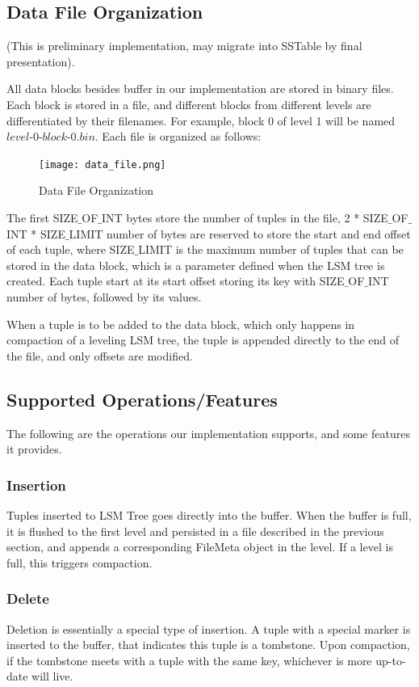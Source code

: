 \documentclass[sigconf]{acmart}
\begin{document}
    \subsection{Data File Organization}
    (This is preliminary implementation, may migrate into SSTable by final presentation).
    
    
    All data blocks besides buffer in our implementation are stored in binary files. Each block is stored in a file, and different blocks from different levels are differentiated by their filenames. For example, block 0 of level 1 will be named $level$-$0$-$block$-$0$.$bin$. Each file is organized as follows: 
    \begin{figure}[H]
        \centering
        \texttt{[image: data\_file.png]}
        \caption{Data File Organization}
        \label{Fig.main1}
    \end{figure}
    The first SIZE$\_$OF$\_$INT bytes store the number of tuples in the file, 2 * SIZE$\_$OF$\_$INT * SIZE$\_$LIMIT number of bytes are reserved to store the start and end offset of each tuple, where SIZE$\_$LIMIT is the maximum number of tuples that can be stored in the data block, which is a parameter defined when the LSM tree is created. Each tuple start at its start offset storing its key with SIZE$\_$OF$\_$INT number of bytes, followed by its values. 
    
    When a tuple is to be added to the data block, which only happens in compaction of a leveling LSM tree, the tuple is appended directly to the end of the file, and only offsets are modified. 
    
    \subsection{Supported Operations/Features}
    The following are the operations our implementation supports, and some features it provides.
    \subsubsection{Insertion}
    Tuples inserted to LSM Tree goes directly into the buffer. When the buffer is full, it is flushed to the first level and persisted in a file described in the previous section, and appends a corresponding FileMeta object in the level. If a level is full, this triggers compaction.
    \subsubsection{Delete}
    Deletion is essentially a special type of insertion. A tuple with a special marker is inserted to the buffer, that indicates this tuple is a tombstone. Upon compaction, if the tombstone meets with a tuple with the same key, whichever is more up-to-date will live.
\end{document}
